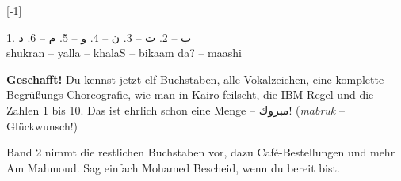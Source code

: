 \begin{center}
\scalebox{-1}[-1]{%
\begin{minipage}{10cm}
\small
1. ب -- 2. ت -- 3. ن -- 4. و -- 5. م -- 6. د\\
shukran -- yalla -- khalaS -- bikaam da? -- maashi
\end{minipage}%
}
\end{center}

\begin{checkpointbox}
\textbf{Geschafft!} Du kennst jetzt elf Buchstaben, alle Vokalzeichen,
eine komplette Begrüßungs-Choreografie, wie man in Kairo feilscht, die
IBM-Regel und die Zahlen 1 bis 10. Das ist ehrlich schon eine Menge --
\textarabic{مبروك!} (\textit{mabruk} -- Glückwunsch!)

Band 2 nimmt die restlichen Buchstaben vor, dazu Café-Bestellungen und
mehr Am Mahmoud. Sag einfach Mohamed Bescheid, wenn du bereit bist.
\end{checkpointbox}
